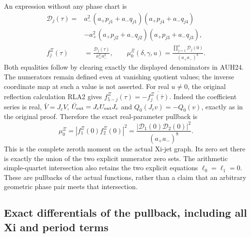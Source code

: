 An expression without any phase chart is
\[
\begin{aligned}
 \mathcal D_j(\tau)
 ={}&a_-^2(a_+p_{j1}+a_-q_{j1})(a_+p_{j4}+a_-q_{j4})\\
 &-a_+^2(a_+p_{j2}+a_-q_{j2})(a_+p_{j3}+a_-q_{j3}),\\
 f_j^{\Xi}(\tau)&=\frac{\mathcal D_j(\tau)}{a_+^2a_-^2},\qquad
 \mu_0^{\Xi}(\delta,\gamma,u)
 =\frac{\prod_{j=1}^4\mathcal D_j(0)}{(a_+a_-)^8}.
\end{aligned}\tag{AUH25}
\]
Both equalities follow by clearing exactly the displayed denominators
in AUH24.  The numerators remain defined even at vanishing quotient
values; the inverse coordinate map at such a value is not asserted.
For real $u\ne0$, the original reflection calculation RLA2 gives
$f_{5-j}^{\Xi}(\tau)=-\overline{f_j^{\Xi}(\bar\tau)}$.
Indeed the coefficient series is real, $\bar V=J_cV$,
$\bar U_{\rm ext}=J_cU_{\rm ext}J_c$ and
$Q_0(J_cv)=-Q_0(v)$, exactly as in the original proof.
Therefore the exact real-parameter pullback is
\[
 \mu_0^{\Xi}
 =|f_1^{\Xi}(0)f_2^{\Xi}(0)|^2
 =\frac{|\mathcal D_1(0)\mathcal D_2(0)|^2}{(a_+a_-)^8}.
 \tag{AUH26}
\]
This is the complete zeroth moment on the actual Xi-jet graph.
Its zero set there is exactly the union of the two explicit
numerator zero sets.  The arithmetic simple-quartet intersection
also retains the two explicit equations $\ell_0=\ell_1=0$.
These are pullbacks of the actual functions, rather than a claim
that an arbitrary geometric phase pair meets that intersection.

\subsection{Exact differentials of the pullback, including all Xi and period terms}


